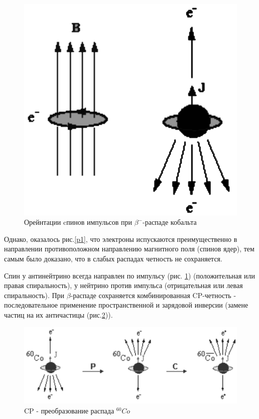 \documentclass[a4paper]{article}
\begin{document}
\begin{figure}[H]
\begin{center}
\begin{minipage}[h]{0.4\linewidth}
    \includegraphics[width=1\linewidth]{p2.png}
    \caption{Орейнтации cпинов импульсов при $\beta^-$-распаде кобальта}
    \label{p2}
    \end{minipage}
    \end{center}
\end{figure}

Однако, оказалось  рис.\ref{p1}, что электроны испускаются преимущественно в направлении 
противоположном направлению магнитного поля (спинов ядер), тем самым было доказано, что в 
слабых распадах четность не сохраняется.

Спин у антинейтрино всегда направлен по импульсу (рис. \ref{p2}) (положительная или правая спиральность), 
у нейтрино против импульса (отрицательная или левая спиральность). При $\beta$-распаде сохраняется комбинированная 
CP-четность - последовательное применение пространственной и зарядовой инверсии (замене частиц на их античастицы (рис.\ref{p3})).

\begin{figure}[H]
    \begin{center}
    \includegraphics[scale = 0.2]{p3.png}
    \caption{CP - преобразование распада $^{60}Co$}
    \label{p3}
    \end{center}
\end{figure}
\end{document}
